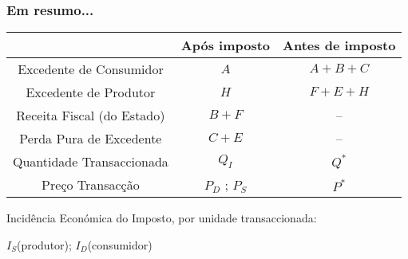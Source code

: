 \begin{frame}
	\frametitle{Em resumo...}
	\begin{center}
		{\renewcommand{\arraystretch}{1.5}
		\begin{tabular}{ccc}
			\rowcolor{iscal_color!50!white}& {\color{white}\textbf{Ap\'os imposto}} & {\color{white}\textbf{ Antes de imposto}} \\\hline
			\rowcolor{iscal_color!20!white}Excedente de Consumidor & $A$ & $A+B+C$ \\
			\rowcolor{iscal_color!10!white}Excedente de Produtor & $H$ & $F+E+H$ \\
			\rowcolor{iscal_color!20!white}Receita Fiscal (do Estado) & $B+F$ & -- \\
			\rowcolor{iscal_color!10!white}Perda Pura de Excedente & $C+E$ & -- \\
			\rowcolor{iscal_color!20!white}Quantidade Transaccionada & $Q_I$ & $Q^*$ \\
			\rowcolor{iscal_color!10!white}Pre\c co Transac\c c\~ao & $P_D$ ; $P_S$ & $P^*$
		\end{tabular}
		}
		\vskip 0.5cm
		Incid\^encia Econ\'omica do Imposto, por unidade transaccionada:\par $I_S$(produtor); $I_D$(consumidor)
	\end{center}
\end{frame}

